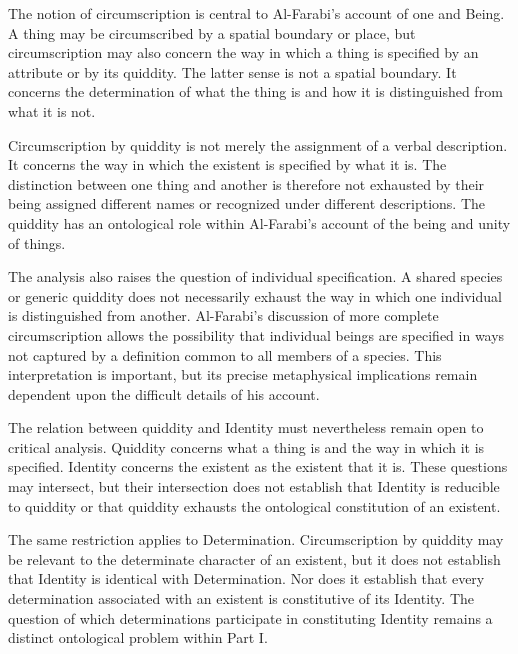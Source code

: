 The notion of circumscription is central
to Al-Farabi's account of one and
Being. A thing may be circumscribed
by a spatial boundary or place, but
circumscription may also concern
the way in which a thing is specified
by an attribute or by its quiddity.
The latter sense is not a spatial
boundary. It concerns the determination
of what the thing is and how it is
distinguished from what it is not.
\citep[sec.~3.6]{MennAlFarabiMetaphysicsSEP2026}

\label{para:VS.B01.P01.C08.S12.SS06.P002}

Circumscription by quiddity is not
merely the assignment of a verbal
description. It concerns the way
in which the existent is specified
by what it is. The distinction between
one thing and another is therefore
not exhausted by their being assigned
different names or recognized under
different descriptions. The quiddity
has an ontological role within
Al-Farabi's account of the being
and unity of things.

\label{para:VS.B01.P01.C08.S12.SS06.P003}

The analysis also raises the question
of individual specification. A shared
species or generic quiddity does not
necessarily exhaust the way in which
one individual is distinguished
from another. Al-Farabi's discussion
of more complete circumscription
allows the possibility that individual
beings are specified in ways not
captured by a definition common
to all members of a species. This
interpretation is important, but
its precise metaphysical implications
remain dependent upon the difficult
details of his account.
\citep[sec.~3.6]{MennAlFarabiMetaphysicsSEP2026}

\label{para:VS.B01.P01.C08.S12.SS06.P004}

The relation between quiddity and
Identity must nevertheless remain
open to critical analysis. Quiddity
concerns what a thing is and the
way in which it is specified.
Identity concerns the existent as
the existent that it is. These
questions may intersect, but their
intersection does not establish
that Identity is reducible to
quiddity or that quiddity exhausts
the ontological constitution of
an existent.

\label{para:VS.B01.P01.C08.S12.SS06.P005}

The same restriction applies to
Determination. Circumscription by
quiddity may be relevant to the
determinate character of an existent,
but it does not establish that
Identity is identical with Determination.
Nor does it establish that every
determination associated with an
existent is constitutive of its
Identity. The question of which
determinations participate in
constituting Identity remains a
distinct ontological problem within
Part I.


